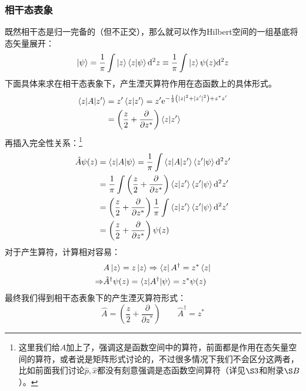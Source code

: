 \documentclass[a4paper,zihao=-4,linespread=1]{ctexrep}
\begin{document}
    \subsubsection{相干态表象}
    既然相干态是归一完备的（但不正交），那么就可以作为Hilbert空间的一组基底将态矢量展开：
    \[\ket\psi=\frac{1}{\pi}\int \ket z\braket{z|\psi}\mathrm{d}^2z\equiv\frac{1}{\pi}\int \ket z\psi(z)\mathrm{d}^2z\]
    下面具体来求在相干态表象下，产生湮灭算符作用在态函数上的具体形式。
    \begin{equation}
    	\begin{aligned}
    		\braket{z|A|z^\prime}&=z^\prime\braket{z|z^\prime}=z^\prime \mathrm{e}^{-\frac{1}{2}\left(|z|^2+|z^\prime|^2\right)+z^*z^\prime}\\&=\left(\frac{z}{2}+\frac{\partial}{\partial z^*}\right)\braket{z|z^\prime}
    	\end{aligned}
    \end{equation}
    再插入完全性关系：\footnote{这里我们给$A$加上了$\hat{ }$，强调这是函数空间中的算符，前面都是作用在态矢量空间的算符，或者说是矩阵形式讨论的，不过很多情况下我们不会区分这两者，比如前面我们讨论$\hat{p},\hat {x}$都没有刻意强调是态函数空间算符（详见$\S 3$和附录$\S B$）。}
    \begin{equation}
    	\begin{aligned}
    		\hat {A}\psi(z)&=\braket{z|A|\psi}=\frac{1}{\pi}\int\braket{z|A|z^\prime}\braket{z^\prime|\psi}\mathrm{d}^2z^\prime\\
    		&=\frac{1}{\pi}\int\left(\frac{z}{2}+\frac{\partial}{\partial z^*}\right)\braket{z|z^\prime}\braket{z^\prime|\psi}\mathrm{d}^2z^\prime\\
    		&=\left(\frac{z}{2}+\frac{\partial}{\partial z^*}\right)\frac{1}{\pi}\int\braket{z|z^\prime}\braket{z^\prime|\psi}\mathrm{d}^2z^\prime\\
    		&=\left(\frac{z}{2}+\frac{\partial}{\partial z^*}\right)\psi(z)
    	\end{aligned}
    \end{equation}
    对于产生算符，计算相对容易：
    \begin{equation}
    	\begin{aligned}
    	&A\ket{z}=z\ket{z}\Rightarrow\bra{z}A^\dagger=z^*\bra{z}\\
    	\Rightarrow&\hat{A}^\dagger\psi(z)=\braket{z|A^\dagger|\psi}=z^*\psi(z)
    	\end{aligned}
    \end{equation}
    最终我们得到相干态表象下的产生湮灭算符形式：
    \begin{equation}
    	\boxed{\hat{A}=\left(\frac{z}{2}+\frac{\partial}{\partial z^*}\right)\qquad \hat{A}^\dagger=z^*}
    \end{equation}
    
\end{document}
